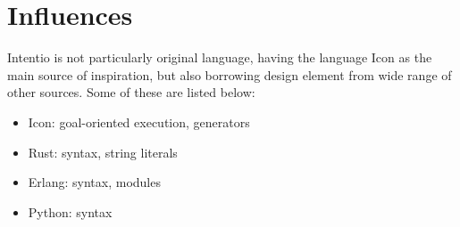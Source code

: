 \chapter{Influences}

Intentio is not particularly original language, having the language Icon as the main source of inspiration, but also borrowing design element from wide range of other sources. Some of these are listed below:

\begin{itemize}
 \item Icon\cite{TheIconProgrammingLanguage}: goal-oriented execution, generators
 \item Rust\cite{TheRustProgrammingLanguage}: syntax, string literals
 \item Erlang\cite{TheErlangProgrammingLanguage}: syntax, modules
 \item Python\cite{ThePythonProgrammingLanguage}: syntax
\end{itemize}

